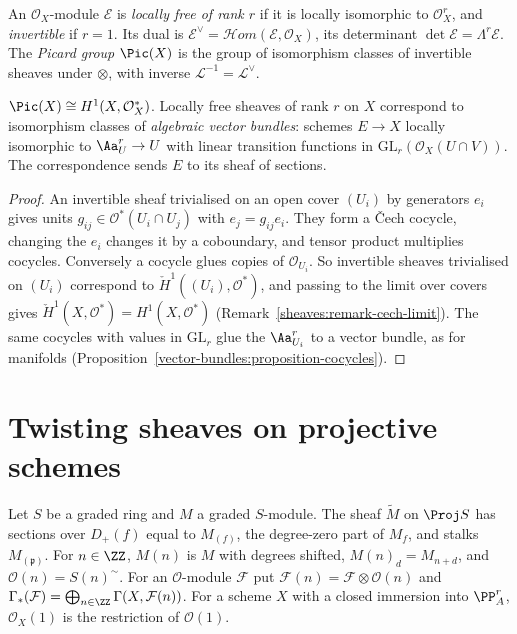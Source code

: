 \begin{definition}\label{schemes:definition-locally-free}
An $\mathcal{O}_X$-module $\mathcal{E}$ is \emph{locally free of rank $r$} if it is locally isomorphic to $\mathcal{O}_X^r$, and \emph{invertible} if $r = 1$. Its
dual is $\mathcal{E}^\vee = \mathcal{H}om(\mathcal{E}, \mathcal{O}_X)$, its determinant $\det\mathcal{E} = \Lambda^r\mathcal{E}$. The \emph{Picard group} $\Pic(X)$ is
the group of isomorphism classes of invertible sheaves under $\otimes$, with inverse $\mathcal{L}^{-1} = \mathcal{L}^\vee$.
\end{definition}

\begin{proposition}\label{schemes:proposition-picard-cech}
$\Pic(X) \cong H^1(X, \mathcal{O}_X^*)$. Locally free sheaves of rank $r$ on $X$ correspond to isomorphism classes of \emph{algebraic vector bundles}: schemes
$E \to X$ locally isomorphic to $\Aa^r_U \to U$ with linear transition functions in $\mathrm{GL}_r(\mathcal{O}_X(U \cap V))$. The correspondence sends $E$ to its sheaf
of sections.
\end{proposition}

\begin{proof}
An invertible sheaf trivialised on an open cover $(U_i)$ by generators $e_i$ gives units $g_{ij} \in \mathcal{O}^*(U_i \cap U_j)$ with $e_j = g_{ij}e_i$. They form a
\v{C}ech cocycle, changing the $e_i$ changes it by a coboundary, and tensor product multiplies cocycles. Conversely a cocycle glues copies of
$\mathcal{O}_{U_i}$. So invertible sheaves trivialised on $(U_i)$ correspond to $\check H^1((U_i), \mathcal{O}^*)$, and passing to the limit over covers gives
$\check H^1(X, \mathcal{O}^*) = H^1(X, \mathcal{O}^*)$ (Remark~\ref{sheaves:remark-cech-limit}). The same cocycles with values in $\mathrm{GL}_r$ glue the
$\Aa^r_{U_i}$ to a vector bundle, as for manifolds (Proposition~\ref{vector-bundles:proposition-cocycles}).
\end{proof}

\section{Twisting sheaves on projective schemes}\label{schemes:section-twisting}

\begin{definition}\label{schemes:definition-twisting}
Let $S$ be a graded ring and $M$ a graded $S$-module. The sheaf $\widetilde M$ on $\Proj S$ has sections over $D_+(f)$ equal to $M_{(f)}$, the degree-zero part
of $M_f$, and stalks $M_{(\mathfrak{p})}$. For $n \in \ZZ$, $M(n)$ is $M$ with degrees shifted, $M(n)_d = M_{n+d}$, and $\mathcal{O}(n) = S(n)^\sim$. For an
$\mathcal{O}$-module $\mathcal{F}$ put $\mathcal{F}(n) = \mathcal{F} \otimes \mathcal{O}(n)$ and $\Gamma_*(\mathcal{F}) = \bigoplus_{n \in \ZZ}\Gamma(X, \mathcal{F}(n))$.
For a scheme $X$ with a closed immersion into $\PP^r_A$, $\mathcal{O}_X(1)$ is the restriction of $\mathcal{O}(1)$.
\end{definition}

